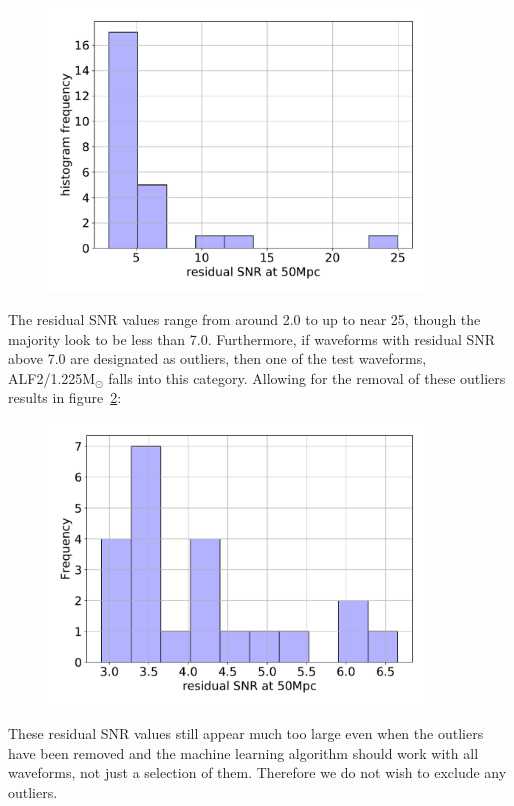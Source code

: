 \begin{figure}[H]
	\centering
	\includegraphics[width=10cm]{./img/CannonLogAmpPh-hist-cv.pdf} 
	\caption[\protect]{\protect}
	\label{fig:CannonLogAmpPh-hist-cv}
\end{figure}
The residual SNR values range from around 2.0 to up to near 25, though the majority look to be less than 7.0. Furthermore, if waveforms with residual SNR above 7.0 are designated as outliers, then one of the test waveforms, ALF2/1.225M$_\odot$ falls into this category. Allowing for the removal of these outliers results in figure~\ref{fig:CannonLogAmpPh-noout-hist-cv}:
\begin{figure}[H]
	\centering
	\includegraphics[width=10cm]{./img/CannonLogAmpPh-noout-hist-cv.pdf} 
	\caption[\protect]{\protect}
	\label{fig:CannonLogAmpPh-noout-hist-cv}
\end{figure}
These residual SNR values still appear much too large even when the outliers have been removed and the machine learning algorithm should work with all waveforms, not just a selection of them. Therefore we do not wish to exclude any outliers. 

